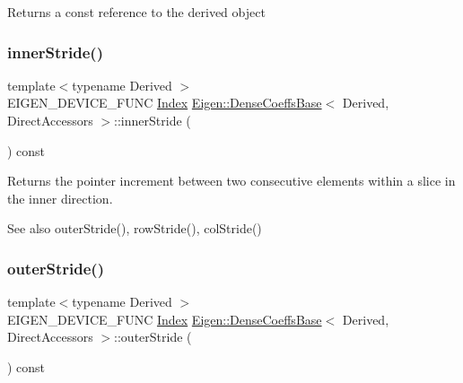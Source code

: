 \begin{DoxyReturn}{Returns}
a const reference to the derived object 
\end{DoxyReturn}
\mbox{\label{class_eigen_1_1_dense_coeffs_base_3_01_derived_00_01_direct_accessors_01_4_a4f877f649686a935771dceaf3569b1fc}} 
\subsubsection{\texorpdfstring{innerStride()}{innerStride()}}
{\footnotesize\ttfamily template$<$typename Derived $>$ \\
E\+I\+G\+E\+N\+\_\+\+D\+E\+V\+I\+C\+E\+\_\+\+F\+U\+NC \mbox{\hyperlink{struct_eigen_1_1_eigen_base_a554f30542cc2316add4b1ea0a492ff02}{Index}} \mbox{\hyperlink{class_eigen_1_1_dense_coeffs_base}{Eigen\+::\+Dense\+Coeffs\+Base}}$<$ Derived, Direct\+Accessors $>$\+::inner\+Stride (\begin{DoxyParamCaption}{ }\end{DoxyParamCaption}) const\hspace{0.3cm}{\ttfamily [inline]}}

\begin{DoxyReturn}{Returns}
the pointer increment between two consecutive elements within a slice in the inner direction.
\end{DoxyReturn}
\begin{DoxySeeAlso}{See also}
outer\+Stride(), row\+Stride(), col\+Stride() 
\end{DoxySeeAlso}
\mbox{\label{class_eigen_1_1_dense_coeffs_base_3_01_derived_00_01_direct_accessors_01_4_aa5b9d836576cb6fa037d32a7414b1110}} 
\subsubsection{\texorpdfstring{outerStride()}{outerStride()}}
{\footnotesize\ttfamily template$<$typename Derived $>$ \\
E\+I\+G\+E\+N\+\_\+\+D\+E\+V\+I\+C\+E\+\_\+\+F\+U\+NC \mbox{\hyperlink{struct_eigen_1_1_eigen_base_a554f30542cc2316add4b1ea0a492ff02}{Index}} \mbox{\hyperlink{class_eigen_1_1_dense_coeffs_base}{Eigen\+::\+Dense\+Coeffs\+Base}}$<$ Derived, Direct\+Accessors $>$\+::outer\+Stride (\begin{DoxyParamCaption}{ }\end{DoxyParamCaption}) const\hspace{0.3cm}{\ttfamily [inline]}}

